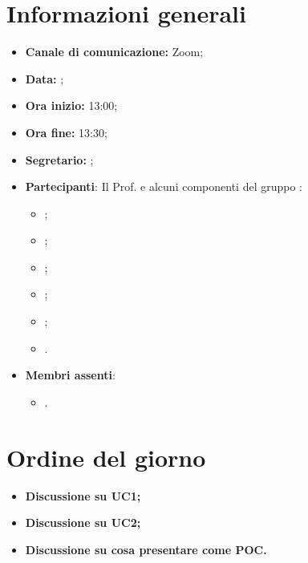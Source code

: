 \section{Informazioni generali}

\begin{itemize}

    \item \textbf{Canale di comunicazione:} Zoom;

    \item \textbf{Data:} \DataMeeting{};
    
    \item \textbf{Ora inizio:} 13:00;

    \item \textbf{Ora fine:} 13:30;

    \item \textbf{Segretario:} \Davide{};

    \item \textbf{Partecipanti}: Il Prof. \Riccardo{} e alcuni componenti del gruppo \Gruppo{}:
    
        \begin{itemize}
            \item \Daniele{};
            \item \Davide{};
            \item \Francesco{};
            \item \Giosue{};
            \item \Lucrezia{};
            \item \Matteo{}.
        \end{itemize}

    \item \textbf{Membri assenti}:
        \begin{itemize}
            \item \Tommaso{}.
        \end{itemize}
\end{itemize}
\section{Ordine del giorno}

\begin{itemize}
    \item\textbf{Discussione su UC1;}
    \item\textbf{Discussione su UC2;}
    \item\textbf{Discussione su cosa presentare come POC.}
\end{itemize}


